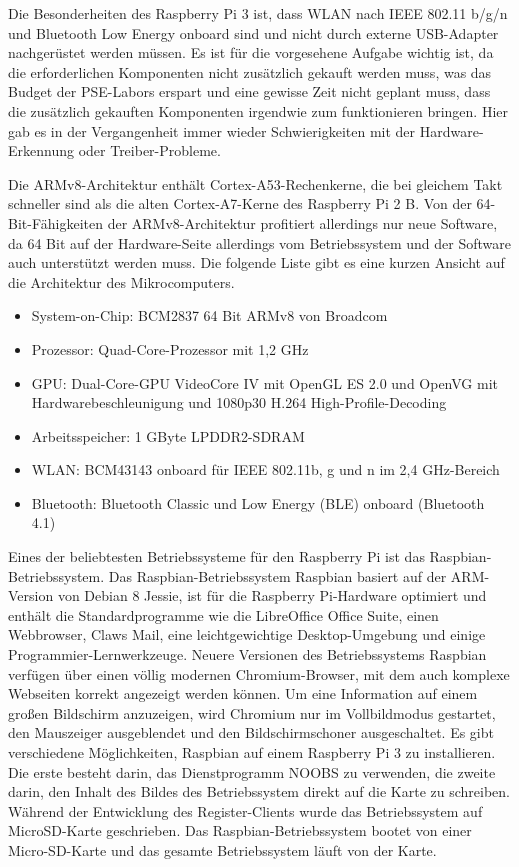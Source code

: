 Die Besonderheiten des Raspberry Pi 3 ist, dass WLAN nach IEEE 802.11 b/g/n und Bluetooth Low Energy onboard sind und nicht durch externe USB-Adapter nachgerüstet werden müssen. Es ist für die vorgesehene Aufgabe wichtig ist, da die erforderlichen Komponenten nicht zusätzlich gekauft werden muss, was das Budget der PSE-Labors erspart und eine gewisse Zeit nicht geplant muss, dass die zusätzlich gekauften Komponenten irgendwie zum funktionieren bringen. Hier gab es in der Vergangenheit immer wieder Schwierigkeiten mit der Hardware-Erkennung oder Treiber-Probleme. 

Die ARMv8-Architektur enthält Cortex-A53-Rechenkerne, die bei gleichem Takt schneller sind als die alten Cortex-A7-Kerne des Raspberry Pi 2 B. Von der 64-Bit-Fähigkeiten der ARMv8-Architektur profitiert allerdings nur neue Software, da 64 Bit auf der Hardware-Seite allerdings vom Betriebssystem und der Software auch unterstützt werden muss. Die folgende Liste gibt es eine kurzen Ansicht auf die Architektur des Mikrocomputers.
\begin{itemize}
\item System-on-Chip: BCM2837 64 Bit ARMv8 von Broadcom
\item Prozessor: Quad-Core-Prozessor mit 1,2 GHz
\item GPU: Dual-Core-GPU VideoCore IV mit OpenGL ES 2.0 und OpenVG mit Hardwarebeschleunigung und 1080p30 H.264 High-Profile-Decoding
\item Arbeitsspeicher: 1 GByte LPDDR2-SDRAM
\item WLAN: BCM43143 onboard für IEEE 802.11b, g und n im 2,4 GHz-Bereich
\item Bluetooth: Bluetooth Classic und Low Energy (BLE) onboard (Bluetooth 4.1)  
\end{itemize}
Eines der beliebtesten Betriebssysteme für den Raspberry Pi ist das Raspbian-Betriebssystem. Das Raspbian-Betriebssystem Raspbian basiert auf der ARM-Version von Debian 8 Jessie, ist für die Raspberry Pi-Hardware optimiert  und enthält die Standardprogramme wie die LibreOffice Office Suite, einen Webbrowser, Claws Mail, eine leichtgewichtige Desktop-Umgebung und einige Programmier-Lernwerkzeuge. Neuere Versionen des Betriebssystems Raspbian verfügen über einen völlig modernen Chromium-Browser, mit dem auch komplexe Webseiten korrekt angezeigt werden können. Um eine Information auf einem großen Bildschirm anzuzeigen, wird Chromium nur im Vollbildmodus gestartet, den Mauszeiger ausgeblendet und den Bildschirmschoner ausgeschaltet. Es gibt verschiedene Möglichkeiten, Raspbian auf einem Raspberry Pi 3 zu installieren. Die erste besteht darin, das Dienstprogramm NOOBS zu verwenden, die zweite darin, den Inhalt des Bildes des Betriebssystem direkt auf die Karte zu schreiben. Während der Entwicklung des Register-Clients wurde das Betriebssystem auf MicroSD-Karte geschrieben. Das Raspbian-Betriebssystem bootet von einer Micro-SD-Karte und das gesamte Betriebssystem läuft von der Karte. 


